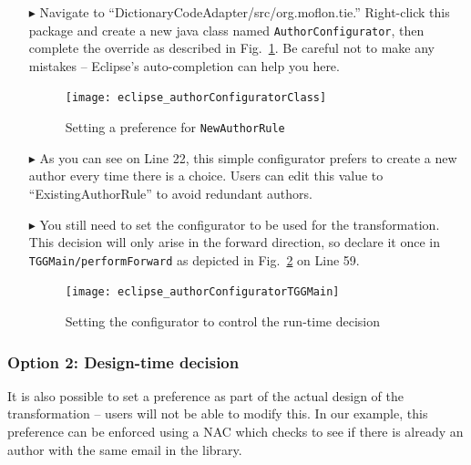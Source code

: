 \begin{itemize}

\item[$\blacktriangleright$] Navigate to ``DictionaryCodeAdapter/src/org.moflon.tie.'' Right-click this package and create a new java class named
\texttt{Author\-Config\-ur\-at\-or}, then complete the override as described in Fig.~\ref{eclipse:authorConfig}. Be careful not to make any mistakes --
Eclipse's auto-completion can help you here.

\begin{figure}[htbp]
  \texttt{[image: eclipse\_authorConfiguratorClass]}
  \caption{Setting a preference for \texttt{NewAuthorRule}}
  \label{eclipse:authorConfig}
\end{figure}

\clearpage

\item[$\blacktriangleright$] As you can see on Line 22, this simple configurator prefers to create a new author every time there is a choice. Users can
edit this value to ``ExistingAuthorRule'' to avoid redundant authors.

\item[$\blacktriangleright$] You still need to set the configurator to be used for the transformation. This decision will only arise in the forward
direction, so declare it once in \texttt{TGGMain/performForward} as depicted in Fig.~\ref{eclipse:editTGGMain} on Line 59.

\vspace{0.5cm}

\begin{figure}[htbp]
\begin{center}
  \texttt{[image: eclipse\_authorConfiguratorTGGMain]}
  \caption{Setting the configurator to control the run-time decision}
  \label{eclipse:editTGGMain}
\end{center}
\end{figure}

\end{itemize}

\subsubsection{Option 2: Design-time decision}

It is also possible to set a preference as part of the actual design of the transformation -- users will not be able to modify this. In our example, this
preference can be enforced using a NAC which checks to see if there is already an author with the same email in the library.

